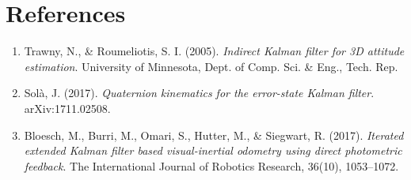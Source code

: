 \documentclass[11pt,a4paper]{article}
\begin{document}
\section*{References}

\begin{enumerate}
  \item Trawny, N., \& Roumeliotis, S. I. (2005). \textit{Indirect Kalman filter for 3D attitude estimation}. University of Minnesota, Dept. of Comp. Sci. \& Eng., Tech. Rep.
  \item Sol\`a, J. (2017). \textit{Quaternion kinematics for the error-state Kalman filter}. arXiv:1711.02508.
  \item Bloesch, M., Burri, M., Omari, S., Hutter, M., \& Siegwart, R. (2017). \textit{Iterated extended Kalman filter based visual-inertial odometry using direct photometric feedback}. The International Journal of Robotics Research, 36(10), 1053--1072.
\end{enumerate}
\end{document}
